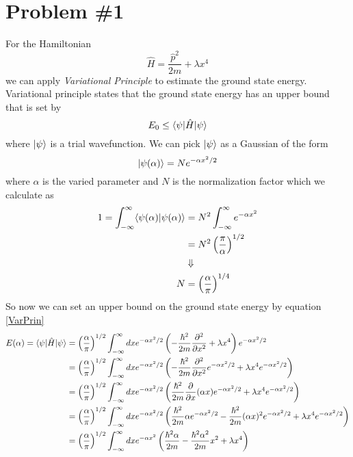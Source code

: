 \documentclass[11pt]{article}
\numberwithin{equation}{section}
\begin{document}


\section{Problem \#1}
For the Hamiltonian 
$$\hat{H} = \frac{\hat{p}^2}{2m} + \lambda x^4$$
we can apply \emph{Variational Principle} to estimate the ground state energy. Variational principle states that the ground state energy has an upper bound that is set by
\begin{equation}
E_0 \le \langle{\psi}|\hat{H}|{\psi}\rangle
\label{VarPrin}
\end{equation}
where $|{\psi}\rangle$ is a trial wavefunction. We can pick $|{\psi}\rangle$ as a Gaussian of the form
$$|{\psi(\alpha)}\rangle = Ne^{-\alpha x^2/2}$$
where $\alpha$ is the varied parameter and $N$ is the normalization factor which we calculate as
\begin{align*}
1 = \int_{-\infty}^{\infty}\langle{\psi(\alpha)}|{\psi(\alpha)}\rangle &= N^2\int_{-\infty}^{\infty}e^{-\alpha x^2}\\
&= N^2\left(\frac{\pi}{\alpha}\right)^{1/2}\\
&\Downarrow\\
N &= \left(\frac{\alpha}{\pi}\right)^{1/4}
\end{align*}
So now we can set an upper bound on the ground state energy by equation \ref{VarPrin}
\begin{align*}
E(\alpha) = \langle{\psi}|\hat{H}|{\psi}\rangle &= \left(\frac{\alpha}{\pi}\right)^{1/2}\int_{-\infty}^{\infty}dxe^{-\alpha x^2/2}\left(-\frac{\hbar^2}{2m}\frac{\partial^2}{\partial x^2} + \lambda x^4\right)e^{-\alpha x^2/2}\\
&= \left(\frac{\alpha}{\pi}\right)^{1/2}\int_{-\infty}^{\infty}dxe^{-\alpha x^2/2}\left(-\frac{\hbar^2}{2m}\frac{\partial^2}{\partial x^2}e^{-\alpha x^2/2} + \lambda x^4e^{-\alpha x^2/2}\right)\\
&= \left(\frac{\alpha}{\pi}\right)^{1/2}\int_{-\infty}^{\infty}dxe^{-\alpha x^2/2}\left(\frac{\hbar^2}{2m}\frac{\partial}{\partial x}(\alpha x)e^{-\alpha x^2/2} + \lambda x^4e^{-\alpha x^2/2}\right)\\
&= \left(\frac{\alpha}{\pi}\right)^{1/2}\int_{-\infty}^{\infty}dxe^{-\alpha x^2/2}\left(\frac{\hbar^2}{2m}\alpha e^{-\alpha x^2/2} - \frac{\hbar^2}{2m}(\alpha x)^2 e^{-\alpha x^2/2} + \lambda x^4e^{-\alpha x^2/2}\right)\\
&= \left(\frac{\alpha}{\pi}\right)^{1/2}\int_{-\infty}^{\infty}dxe^{-\alpha x^2}\left(\frac{\hbar^2\alpha}{2m} - \frac{\hbar^2\alpha^2}{2m}x^2 + \lambda x^4\right)
\end{align*}
\end{document}
